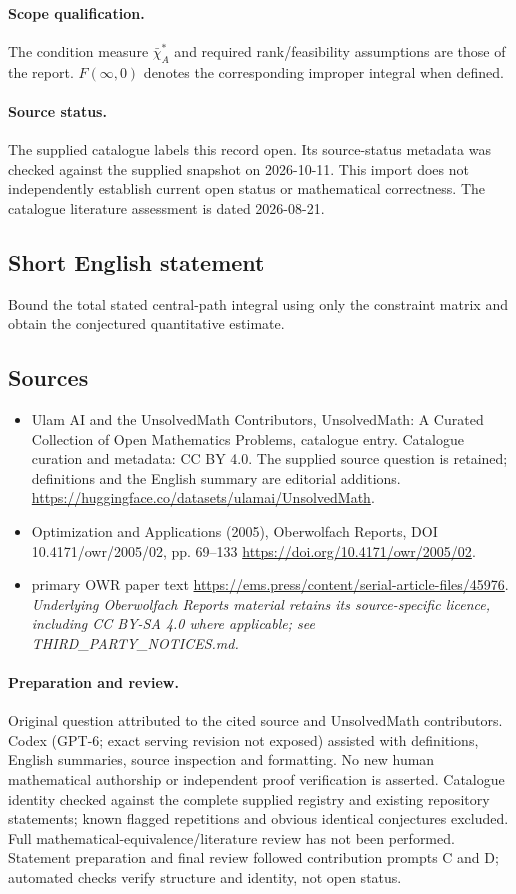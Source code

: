 \documentclass[11pt]{article}
\begin{document}
\paragraph{Scope qualification.}
The condition measure $\bar\chi_A^*$ and required rank/feasibility assumptions are those of the report. $F(\infty,0)$ denotes the corresponding improper integral when defined.
\paragraph{Source status.}
The supplied catalogue labels this record open. Its source-status metadata was checked against the supplied snapshot on 2026-10-11. This import does not independently establish current open status or mathematical correctness. The catalogue literature assessment is dated 2026-08-21.
\subsection{Short English statement}
Bound the total stated central-path integral using only the constraint matrix and obtain the conjectured quantitative estimate.
\subsection{Sources}
\begin{itemize}
\item[S1] Ulam AI and the UnsolvedMath Contributors, UnsolvedMath: A Curated Collection of Open Mathematics Problems, catalogue entry. Catalogue curation and metadata: CC BY 4.0. The supplied source question is retained; definitions and the English summary are editorial additions.
\url{https://huggingface.co/datasets/ulamai/UnsolvedMath}.
\item[S2] Optimization and Applications (2005), Oberwolfach Reports, DOI 10.4171/owr/2005/02, pp. 69--133
\url{https://doi.org/10.4171/owr/2005/02}.
\item[S3] primary OWR paper text
\url{https://ems.press/content/serial-article-files/45976}.
\textit{Underlying Oberwolfach Reports material retains its source-specific licence, including CC BY-SA 4.0 where applicable; see THIRD\_PARTY\_NOTICES.md.}
\end{itemize}
\paragraph{Preparation and review.}
Original question attributed to the cited source and UnsolvedMath contributors. Codex (GPT-6; exact serving revision not exposed) assisted with definitions, English summaries, source inspection and formatting. No new human mathematical authorship or independent proof verification is asserted. Catalogue identity checked against the complete supplied registry and existing repository statements; known flagged repetitions and obvious identical conjectures excluded. Full mathematical-equivalence/literature review has not been performed. Statement preparation and final review followed contribution prompts C and D; automated checks verify structure and identity, not open status.
\label{end:statement}
\end{document}
